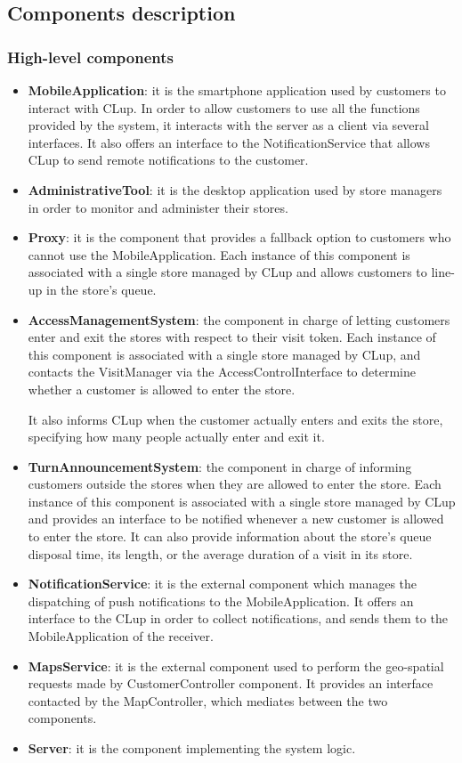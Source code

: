 \documentclass[a4paper,oneside,11pt]{book}
\begin{document}
    \subsection{Components description}
    \subsubsection{High-level components}
    \begin{itemize}
        \item \textbf{MobileApplication}: it is the smartphone application used by customers to interact with CLup. In order to allow customers to use all the functions provided by the system, it interacts with the server as a client via several interfaces. It also offers an interface to the NotificationService that allows CLup to send remote notifications to the customer.
        \item \textbf{AdministrativeTool}: it is the desktop application used by store managers in order to monitor and administer their stores.
        \item \textbf{Proxy}: it is the component that provides a fallback option to customers who cannot use the MobileApplication. Each instance of this component is associated with a single store managed by CLup and allows customers to line-up in the store’s queue.
        \item \textbf{AccessManagementSystem}: the component in charge of letting customers enter and exit the stores with respect to their visit token. Each instance of this component is associated with a single store managed by CLup, and contacts the VisitManager via the AccessControlInterface to determine whether a customer is allowed to enter the store. \par 
        It also informs CLup when the customer actually enters and exits the store, specifying how many people actually enter and exit it.
        \item \textbf{TurnAnnouncementSystem}: the component in charge of informing customers outside the stores when they are allowed to enter the store. Each instance of this component is associated with a single store managed by CLup and provides an interface to be notified whenever a new customer is allowed to enter the store. It can also provide information about the store’s queue disposal time, its length, or the average duration of a visit in its store.
        \item \textbf{NotificationService}: it is the external component which manages the dispatching of push notifications to the MobileApplication. It offers an interface to the CLup in order to collect notifications, and sends them to the MobileApplication of the receiver. 
        \item \textbf{MapsService}: it is the external component used to perform the geo-spatial requests made by CustomerController component. It provides an interface contacted by the MapController, which mediates between the two components.
        \item \textbf{Server}: it is the component implementing the system logic.
    \end{itemize}
\end{document}
